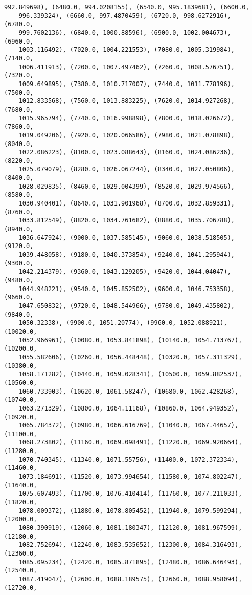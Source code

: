 \documentclass[12pt, letterpaper, oneside]{report}
\begin{document}
\begin{lstlisting}[frame=none]
    992.849698), (6480.0, 994.0208155), (6540.0, 995.1839681), (6600.0, 
    996.339324), (6660.0, 997.4870459), (6720.0, 998.6272916), (6780.0, 
    999.7602136), (6840.0, 1000.88596), (6900.0, 1002.004673), (6960.0, 
    1003.116492), (7020.0, 1004.221553), (7080.0, 1005.319984), (7140.0, 
    1006.411913), (7200.0, 1007.497462), (7260.0, 1008.576751), (7320.0, 
    1009.649895), (7380.0, 1010.717007), (7440.0, 1011.778196), (7500.0, 
    1012.833568), (7560.0, 1013.883225), (7620.0, 1014.927268), (7680.0, 
    1015.965794), (7740.0, 1016.998898), (7800.0, 1018.026672), (7860.0, 
    1019.049206), (7920.0, 1020.066586), (7980.0, 1021.078898), (8040.0, 
    1022.086223), (8100.0, 1023.088643), (8160.0, 1024.086236), (8220.0, 
    1025.079079), (8280.0, 1026.067244), (8340.0, 1027.050806), (8400.0, 
    1028.029835), (8460.0, 1029.004399), (8520.0, 1029.974566), (8580.0, 
    1030.940401), (8640.0, 1031.901968), (8700.0, 1032.859331), (8760.0, 
    1033.812549), (8820.0, 1034.761682), (8880.0, 1035.706788), (8940.0, 
    1036.647924), (9000.0, 1037.585145), (9060.0, 1038.518505), (9120.0, 
    1039.448058), (9180.0, 1040.373854), (9240.0, 1041.295944), (9300.0, 
    1042.214379), (9360.0, 1043.129205), (9420.0, 1044.04047), (9480.0, 
    1044.948221), (9540.0, 1045.852502), (9600.0, 1046.753358), (9660.0, 
    1047.650832), (9720.0, 1048.544966), (9780.0, 1049.435802), (9840.0, 
    1050.32338), (9900.0, 1051.20774), (9960.0, 1052.088921), (10020.0, 
    1052.966961), (10080.0, 1053.841898), (10140.0, 1054.713767), (10200.0, 
    1055.582606), (10260.0, 1056.448448), (10320.0, 1057.311329), (10380.0, 
    1058.171282), (10440.0, 1059.028341), (10500.0, 1059.882537), (10560.0, 
    1060.733903), (10620.0, 1061.58247), (10680.0, 1062.428268), (10740.0, 
    1063.271329), (10800.0, 1064.11168), (10860.0, 1064.949352), (10920.0, 
    1065.784372), (10980.0, 1066.616769), (11040.0, 1067.44657), (11100.0, 
    1068.273802), (11160.0, 1069.098491), (11220.0, 1069.920664), (11280.0, 
    1070.740345), (11340.0, 1071.55756), (11400.0, 1072.372334), (11460.0, 
    1073.184691), (11520.0, 1073.994654), (11580.0, 1074.802247), (11640.0, 
    1075.607493), (11700.0, 1076.410414), (11760.0, 1077.211033), (11820.0, 
    1078.009372), (11880.0, 1078.805452), (11940.0, 1079.599294), (12000.0, 
    1080.390919), (12060.0, 1081.180347), (12120.0, 1081.967599), (12180.0, 
    1082.752694), (12240.0, 1083.535652), (12300.0, 1084.316493), (12360.0, 
    1085.095234), (12420.0, 1085.871895), (12480.0, 1086.646493), (12540.0, 
    1087.419047), (12600.0, 1088.189575), (12660.0, 1088.958094), (12720.0, 

\end{lstlisting}
\end{document}
